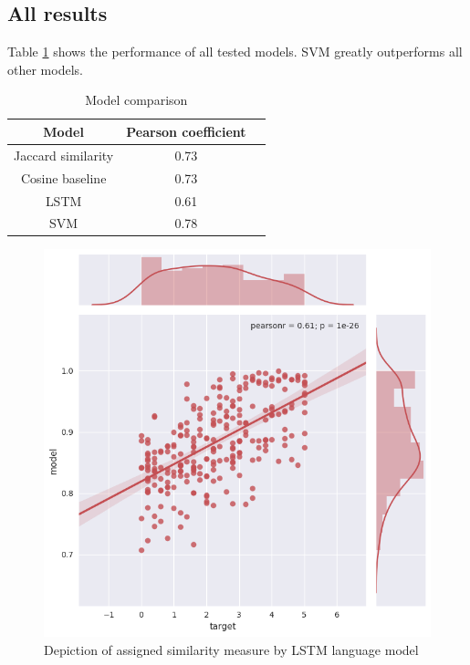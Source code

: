 \documentclass[10pt, a4paper]{article}
\begin{document}
\subsection{All results}

Table \ref{tab:all_results} shows the performance of all tested models.
SVM greatly outperforms all other models.

\begin{table}
	\caption{Model comparison}
\label{tab:all_results}
\begin{center}
\begin{tabular}{ccc}
\toprule
Model & Pearson coefficient \\
\midrule
Jaccard similarity & 0.73 \\
Cosine baseline & 0.73 \\
LSTM & 0.61 \\
SVM & 0.78 \\
\bottomrule
\end{tabular}
\end{center}
\end{table}


\newpage
\begin{figure}
	\begin{center}
	\includegraphics[width=\columnwidth]{lstm_corr.png}
	\caption{Depiction of assigned similarity measure by LSTM language model}
	\label{fig:lstm_corr}
	\end{center}
\end{figure}
\end{document}
